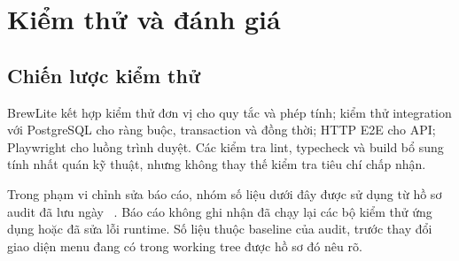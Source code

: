 \chapter{Kiểm thử và đánh giá}
\label{chap:kiem-thu}

\section{Chiến lược kiểm thử}
BrewLite kết hợp kiểm thử đơn vị cho quy tắc và phép tính; kiểm thử
integration với PostgreSQL cho ràng buộc, transaction và đồng thời;
HTTP E2E cho API; Playwright cho luồng trình duyệt. Các kiểm tra lint,
typecheck và build bổ sung tính nhất quán kỹ thuật, nhưng không thay thế
kiểm tra tiêu chí chấp nhận.

Trong phạm vi chỉnh sửa báo cáo, nhóm số liệu dưới đây được sử dụng từ
hồ sơ audit đã lưu ngày \NgayDoiChieu~\cite{audit}. Báo cáo không ghi nhận
đã chạy lại các bộ kiểm thử ứng dụng hoặc đã sửa lỗi runtime. Số liệu
thuộc baseline của audit, trước thay đổi giao diện menu đang có trong
working tree được hồ sơ đó nêu rõ.

